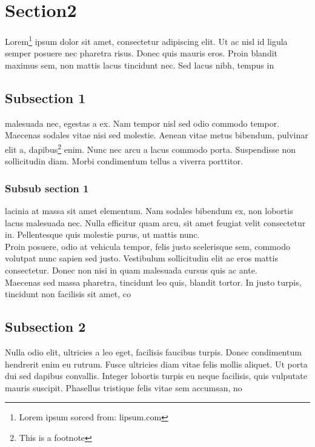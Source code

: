 \documentclass[]{article}
\begin{document}
\section{Section2}
Lorem\footnote{Lorem ipsum sorced from: lipsum.com} ipsum dolor sit amet, consectetur adipiscing elit. Ut ac nisl id ligula semper posuere nec pharetra risus. Donec quis mauris eros. Proin blandit maximus sem, non mattis lacus tincidunt nec. Sed lacus nibh, tempus in
\subsection{Subsection 1}
malesuada nec, egestas a ex. Nam tempor nisl sed odio commodo tempor. Maecenas sodales vitae nisi sed molestie. Aenean vitae metus bibendum, pulvinar elit a, dapibus\footnote{This is a footnote} enim. Nunc nec arcu a lacus commodo porta. Suspendisse non sollicitudin diam. Morbi condimentum tellus a viverra porttitor. 
\subsubsection{Subsub section 1}
lacinia at massa sit amet elementum. Nam sodales bibendum ex, non lobortis lacus malesuada nec. Nulla efficitur quam arcu, sit amet feugiat velit consectetur in. Pellentesque quis molestie purus, ut mattis nunc.\\
Proin posuere, odio at vehicula tempor, felis justo scelerisque sem, commodo volutpat nunc sapien sed justo. Vestibulum sollicitudin elit ac eros mattis consectetur. Donec non nisi in quam malesuada cursus quis ac ante.\\
 Maecenas sed massa pharetra, tincidunt leo quis, blandit tortor. In justo turpis, tincidunt non facilisis sit
 amet, co
\subsection{Subsection 2}
Nulla odio elit, ultricies a leo eget, facilisis faucibus turpis. Donec condimentum hendrerit enim eu rutrum. Fusce ultricies diam vitae felis mollis aliquet. Ut porta dui sed dapibus convallis. Integer lobortis turpis eu neque facilisis, quis vulputate mauris suscipit. Phasellus tristique felis vitae sem accumsan, no
\end{document}
